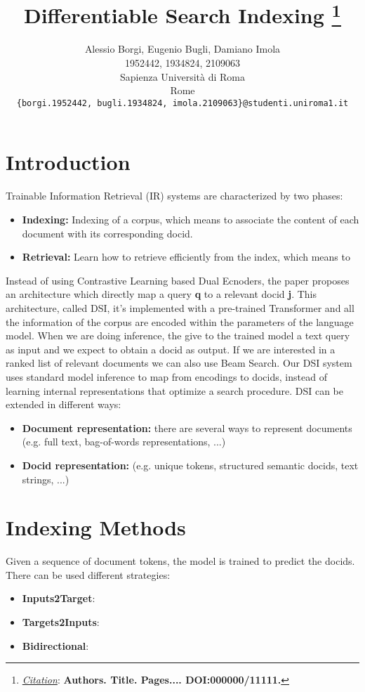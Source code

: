 \documentclass{article}
\title{Differentiable Search Indexing
\thanks{\textit{\underline{Citation}}: 
\textbf{Authors. Title. Pages.... DOI:000000/11111.}} 
}
\author{
  Alessio Borgi, Eugenio Bugli, Damiano Imola \\
  1952442, 1934824, 2109063 \\
  Sapienza Università di Roma \\
  Rome\\
  \texttt{\{borgi.1952442, bugli.1934824, imola.2109063\}@studenti.uniroma1.it} \\
}
\begin{document}
\maketitle


\begin{abstract}
\end{abstract}




\section{Introduction}
Trainable Information Retrieval (IR) systems are characterized by two phases:
\begin{itemize}
  \item \textbf{Indexing: }Indexing of a corpus, which means to associate the content of each document with its corresponding docid.
  \item \textbf{Retrieval: }Learn how to retrieve efficiently from the index, which means to 
\end{itemize}
Instead of using Contrastive Learning based Dual Ecnoders, the paper proposes an architecture which directly map a query \textbf{q} to a relevant docid \textbf{j}. This architecture, called DSI, it's implemented with a pre-trained Transformer and all the information of the corpus are encoded within the parameters of the language model. When we are doing inference, the give to the trained model a text query as input and we expect to obtain a docid as output. If we are interested in a ranked list of relevant documents we can also use Beam Search. Our DSI system uses standard model inference to map from encodings to docids, instead of learning internal representations that optimize a search procedure. DSI can be extended in different ways:
\begin{itemize}
  \item \textbf{Document representation: }there are several ways to represent documents (e.g. full text, bag-of-words representations, ...)
  \item \textbf{Docid representation: }(e.g. unique tokens, structured semantic docids, text strings, ...)
\end{itemize}

\section{Indexing Methods}
Given a sequence of document tokens, the model is trained to predict the docids. There can be used different strategies:
\begin{itemize}
  \item \textbf{Inputs2Target}: 
  \item \textbf{Targets2Inputs}:
  \item \textbf{Bidirectional}: 
\end{itemize}
\end{document}
